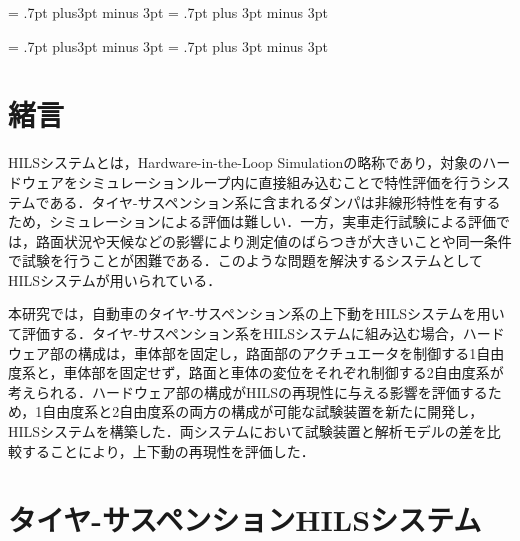 \documentclass{article_vdlab_sotsuron_youshi}
\begin{document}
\kanjiskip = .7pt plus3pt minus 3pt
\xkanjiskip = .7pt plus 3pt minus 3pt
\small
{}

\setlength{\abovecaptionskip}{0mm}
\setlength{\belowcaptionskip}{0mm}
\setlength{\floatsep}{0mm}
\setlength{\textfloatsep}{0mm}
\setlength{\intextsep}{3mm}
\setlength{\dblfloatsep}{0mm}
\setlength{\dbltextfloatsep}{0mm}



\kanjiskip = .7pt plus3pt minus 3pt
\xkanjiskip = .7pt plus 3pt minus 3pt
\small
{}

\section{緒言}
HILSシステムとは，Hardware-in-the-Loop Simulationの略称であり，対象のハードウェアをシミュレーションループ内に直接組み込むことで特性評価を行うシステムである．タイヤ-サスペンション系に含まれるダンパは非線形特性を有するため，シミュレーションによる評価は難しい．一方，実車走行試験による評価では，路面状況や天候などの影響により測定値のばらつきが大きいことや同一条件で試験を行うことが困難である．このような問題を解決するシステムとしてHILSシステムが用いられている\cite{2}．\par
本研究では，自動車のタイヤ-サスペンション系の上下動をHILSシステムを用いて評価する．タイヤ-サスペンション系をHILSシステムに組み込む場合，ハードウェア部の構成は，車体部を固定し，路面部のアクチュエータを制御する1自由度系と，車体部を固定せず，路面と車体の変位をそれぞれ制御する2自由度系が考えられる．ハードウェア部の構成がHILSの再現性に与える影響を評価するため，1自由度系と2自由度系の両方の構成が可能な試験装置を新たに開発し，HILSシステムを構築した．両システムにおいて試験装置と解析モデルの差を比較することにより，上下動の再現性を評価した．

\section{タイヤ-サスペンションHILSシステム}
\vspace*{-1mm}
\end{document}
